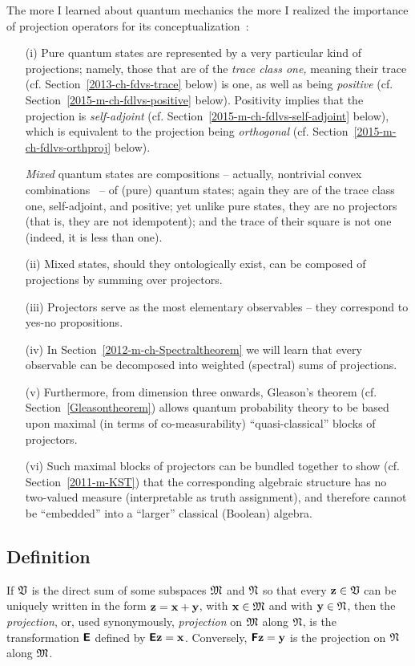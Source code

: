 The more I learned about quantum mechanics the more
I realized the importance of projection operators for its conceptualization~\cite[0mm]{v-neumann-49,birkhoff-36}:
\begin{itemize}
\item[(i)]
Pure quantum states
are represented by a very particular kind of projections;
namely, those that are of the {\em trace class one,} meaning their trace (cf. Section~\ref{2013-ch-fdvs-trace} below) is one,
as well as being {\em positive}
(cf. Section~\ref{2015-m-ch-fdlvs-positive} below).
Positivity implies
that the projection is {\em self-adjoint} (cf. Section~\ref{2015-m-ch-fdlvs-self-adjoint} below),
which is equivalent to the projection being {\em orthogonal}  (cf. Section~\ref{2015-m-ch-fdlvs-orthproj} below).

{\em Mixed} quantum states
are compositions -- actually, nontrivial convex combinations~ -- of (pure) quantum states; again they are of the trace class one, self-adjoint, and positive;
yet unlike pure states, they are no projectors (that is, they are not idempotent);
and the trace of their square is not one (indeed, it is less than one).
\item[(ii)]
Mixed states, should they ontologically exist, can be composed of projections by summing over projectors.
\item[(iii)]
Projectors serve as the most elementary observables -- they correspond to yes-no propositions.
\item[(iv)]
In Section~\ref{2012-m-ch-Spectraltheorem} we will learn
that every observable can be decomposed into weighted (spectral) sums of projections.
\item[(v)]
Furthermore, from dimension three onwards, Gleason's theorem (cf. Section~\ref{Gleasontheorem}) allows
quantum probability theory to be based upon maximal (in terms of co-measurability) ``quasi-classical''
blocks of projectors.
\item[(vi)]
Such maximal blocks of projectors can be bundled together to show (cf. Section~\ref{2011-m-KST})
that the corresponding algebraic
structure has no two-valued measure (interpretable as truth assignment), and
therefore cannot be ``embedded'' into a ``larger'' classical (Boolean) algebra.
\end{itemize}



\subsection{Definition}
If ${\frak V}$ is the direct sum of some subspaces
${\frak M}$
and
${\frak N}$
so that every ${\bf z} \in {\frak V}$ can be uniquely written in the form
$
{\bf z}
=
{\bf x}
+
{\bf y}
$, with
${\bf x} \in {\frak M}$
and with
${\bf y} \in {\frak N}$,
then
the {\em projection}, or, used synonymously,
{\em projection}
on ${\frak M}$
along ${\frak N}$, is the transformation $\textsf{\textbf{E}}$
defined by $\textsf{\textbf{E}}{\bf z}={\bf x}$.
Conversely,
 $\textsf{\textbf{F}}{\bf z}={\bf y}$  is the projection
on ${\frak N}$
along ${\frak M}$.

